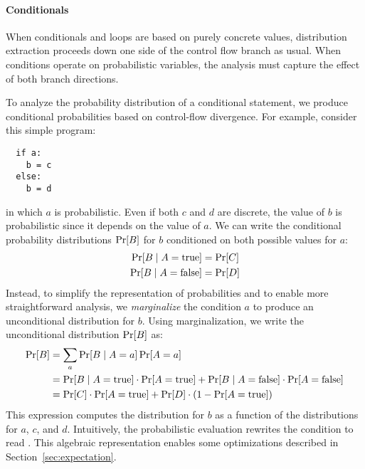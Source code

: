 
\label{sec:conditionals}


\paragraph{Conditionals}
When conditionals and loops are based on purely
concrete values, distribution extraction proceeds down one side
of the control flow branch as usual. When conditions operate on probabilistic variables, the analysis
must capture the effect of both branch directions.

To analyze the probability distribution of a conditional statement,
we produce conditional probabilities
based on control-flow divergence. For example, consider this simple
program:
%
\begin{lstlisting}
  if a:
    b = c
  else:
    b = d
\end{lstlisting}
%
in which $a$ is probabilistic. Even if both $c$
and $d$ are discrete, the value of $b$ is probabilistic since it depends on
the value of $a$. We can write the conditional probability distributions $\Pr\!\left[B\right]$
for $b$ conditioned on both possible values for $a$:
%
\begin{align*}
    \Pr\!\left[B \;|\; A = \mathrm{true}\right] &= \Pr\!\left[C\right]\\
    \Pr\!\left[B \;|\; A = \mathrm{false}\right] &= \Pr\!\left[D\right]
\end{align*}
%
Instead, to simplify the representation of probabilities and to enable more
straightforward analysis, we \emph{marginalize} the condition $a$ to
produce an unconditional distribution for $b$. Using marginalization, we
write the unconditional distribution $\Pr\!\left[B\right]$ as:
%
\begin{align*}
    \prob{B} &= \sum_a \prob{B\;|\; A = a} \prob{A = a} \\
           &= \prob{B \;|\; A = \mathrm{true}} \cdot \prob{A = \mathrm{true}}
            + \prob{B \;|\; A = \mathrm{false}} \cdot \prob{A = \mathrm{false}} \\
           &= \prob{C} \cdot \prob{A=\mathrm{true}}
            + \prob{D} \cdot (1 - \prob{A=\mathrm{true}})
\end{align*}
%
This expression computes the distribution for $b$ as a function of the
distributions for $a$, $c$, and $d$. Intuitively, the probabilistic evaluation rewrites
the condition to read . This algebraic
representation enables some optimizations described
in Section~\ref{sec:expectation}.

